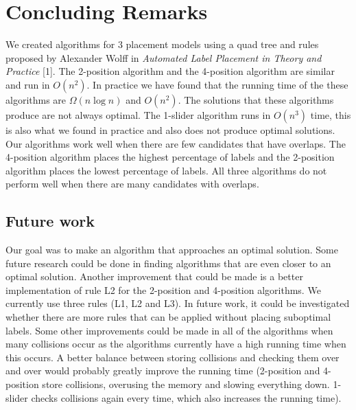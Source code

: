 \documentclass[crop=false,a4paper,oneside,11pt]{standalone}
\begin{document}
\section{Concluding Remarks}
We created algorithms for 3 placement models using a quad tree and rules proposed by Alexander Wolff in \emph{Automated Label Placement in Theory and Practice} [1]. The 2-position algorithm and the 4-position algorithm are similar and run in $O(n^2)$. In practice we have found that the running time of the these algorithms are $\Omega(n\log n)$ and $O(n^2)$. The solutions that these algorithms produce are not always optimal. The 1-slider algorithm runs in $O(n^3)$ time, this is also what we found in practice and also does not produce optimal solutions. Our algorithms work well when there are few candidates that have overlaps. The 4-position algorithm places the highest percentage of labels and the 2-position algorithm places the lowest percentage of labels. All three algorithms do not perform well when there are many candidates with overlaps.

\subsection{Future work}
Our goal was to make an algorithm that approaches an optimal solution. Some future research could be done in finding algorithms that are even closer to an optimal solution. Another improvement that could be made is a better implementation of rule L2 for the 2-position and 4-position algorithms. We currently use three rules (L1, L2 and L3). In future work, it could be investigated whether there are more rules that can be applied without placing suboptimal labels. Some other improvements could be made in all of the algorithms when many collisions occur as the algorithms currently have a high running time when this occurs. A better balance between storing collisions and checking them over and over would probably greatly improve the running time (2-position and 4-position store collisions, overusing the memory and slowing everything down. 1-slider checks collisions again every time, which also increases the running time). 
\end{document}
